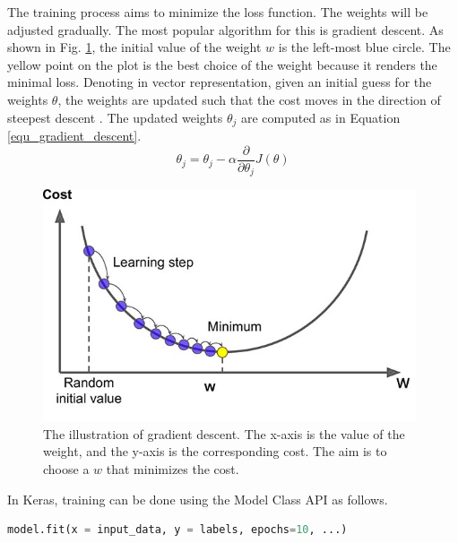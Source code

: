 The training process aims to minimize the loss function. The weights will be adjusted gradually. The most popular algorithm for this is gradient descent. As shown in Fig. \ref{fig_gradient_descent}, the initial value of the weight $w$ is the left-most blue circle. The yellow point on the plot is the best choice of the weight because it renders the minimal loss. Denoting in vector representation, given an initial guess for the weights $\theta$, the weights are updated such that the cost moves in the direction of steepest descent \cite{robbins1951stochastic}. The updated weights $\theta_j$ are computed as in Equation \ref{equ_gradient_descent}.
\begin{equation}
\theta_j=\theta_j - \alpha\frac{\partial}{\partial\theta_j}J(\theta)
 \label{equ_gradient_descent}
\end{equation}

\begin{figure}[h!]
\begin{center}
\includegraphics[width = 11cm]{img/gradient_descent.jpg}
\caption[The illustration of gradient descent]{The illustration of gradient descent. The x-axis is the value of the weight, and the y-axis is the corresponding cost. The aim is to choose a $w$ that minimizes the cost. \label{fig_gradient_descent}}
\end{center}
\end{figure}

In Keras, training can be done using the Model Class API as follows.
\begin{lstlisting}[language=python,frame=single]
model.fit(x = input_data, y = labels, epochs=10, ...)
\end{lstlisting}

